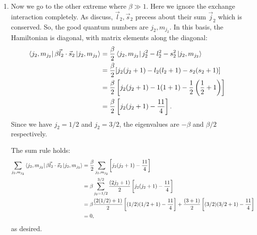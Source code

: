 \documentclass{article}
\theoremstyle{definition}
\newcommand{\be}{\beta}
\newcommand{\f}[2]{\frac{#1}{#2}}
\newcommand{\lp}{\left(}
\newcommand{\rp}{\right)}
\newcommand{\lb}{\left[}
\newcommand{\rb}{\right]}
\begin{document}
\begin{enumerate}[label=(\alph*)]
	\item Now we go to the other extreme where $\be\gg 1$. Here we ignore the exchange interaction completely. As discuss, $\vec{l}_2, \vec{s}_2$ precess about their sum $\vec{j}_2$ which is conserved. So, the good quantum numbers are $j_2, m_{j_2}$. In this basis, the Hamiltonian is diagonal,
	with matrix elements along the diagonal:
	\begin{align*}
	\bra{j_2,m_{j_2}} \be \vec{l}_2 \cdot \vec{s}_2 \ket{j_2,m_{j_2}} 
	&= \f{\be}{2}\bra{j_2,m_{j_2}} j_2^2 - l_2^2 - s_2^2 \ket{j_2,m_{j_2}} \\
	&= \f{\be}{2} [j_2(j_2+1) - l_2(l_2+1) - s_2(s_2+1)] \\
	&= \f{\be}{2}\lb j_2(j_2+1) - 1(1+1) - \f{1}{2}\lp \f{1}{2}+1\rp  \rb \\
	&= \f{\be}{2}\lb j_2(j_2+1) - \f{11}{4} \rb.
	\end{align*}
	Since we have $j_2 = 1/2$ and $j_2 = 3/2$, the eigenvalues are $-\be$ and $\be/2$ respectively. 
	
	
	
	The sum rule holds:
	\begin{align*}
	\sum_{j_2,m_{j_2}} \bra{j_2,m_{j_2}} \be \vec{l}_2 \cdot \vec{s}_2 \ket{j_2,m_{j_2}} 
	&= \f{\be}{2}\sum_{j_2,m_{j_2}} \lb j_2(j_2+1) - \f{11}{4} \rb \\
	&= \be \sum_{j_2 = 1/2}^{3/2} \f{(2j_2+1)}{2}  \lb j_2(j_2+1) - \f{11}{4} \rb \\
	&= \be \f{(2(1/2)+1)}{2}  \lb (1/2)(1/2+1) - \f{11}{4} \rb + \f{(3+1)}{2}  \lb (3/2)(3/2+1) - \f{11}{4} \rb\\
	&= 0,
	\end{align*}
	as desired. 
	

\end{enumerate}
\end{document}
